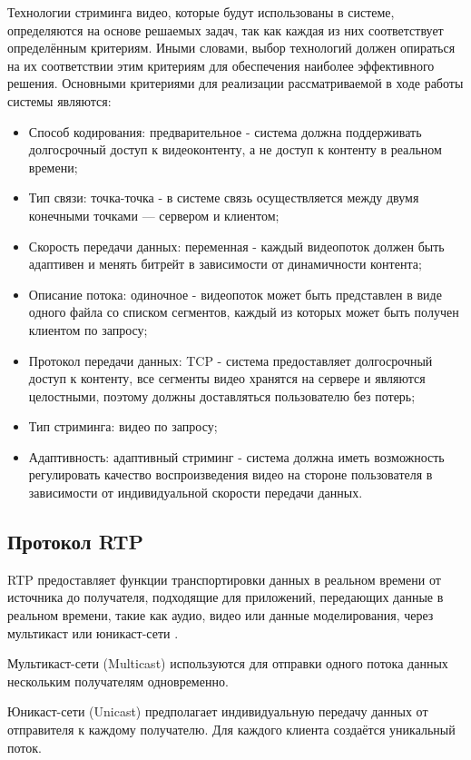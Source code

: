 	Технологии стриминга видео, которые будут использованы в системе, определяются на основе решаемых задач, так как каждая из них соответствует определённым критериям. Иными словами, выбор технологий должен опираться на их соответствии этим критериям для обеспечения наиболее эффективного решения. Основными критериями для реализации рассматриваемой в ходе работы системы являются:

	
	\begin{itemize}[label=$\bullet$]
		\item Способ кодирования: предварительное - система должна поддерживать долгосрочный доступ к видеоконтенту, а не доступ к контенту в реальном времени;
		\item Тип связи: точка-точка - в системе связь осуществляется между двумя конечными точками — сервером и клиентом;
		\item Скорость передачи данных: переменная - каждый видеопоток должен быть адаптивен и менять битрейт в зависимости от динамичности контента;
		\item Описание потока: одиночное - видеопоток может быть представлен в виде одного файла со списком сегментов, каждый из которых может быть получен клиентом по запросу;
		\item Протокол передачи данных: TCP - система предоставляет долгосрочный доступ к контенту, все сегменты видео хранятся на сервере и являются целостными, поэтому должны доставляться пользователю без потерь;
		\item Тип стриминга: видео по запросу;
		\item Адаптивность: адаптивный стриминг - система должна иметь возможность регулировать качество воспроизведения видео на стороне пользователя в зависимости от индивидуальной скорости передачи данных.
	\end{itemize}


\subsection{Протокол RTP}

	RTP предоставляет функции транспортировки данных в реальном времени от источника до получателя, подходящие для приложений, передающих данные в реальном времени, такие как аудио, видео или данные моделирования, через мультикаст или юникаст-сети \cite{rfcRtp}.

	Мультикаст-сети (Multicast) используются для отправки одного потока данных нескольким получателям одновременно.

	Юникаст-сети (Unicast) предполагает индивидуальную передачу данных от отправителя к каждому получателю. Для каждого клиента создаётся уникальный поток.

